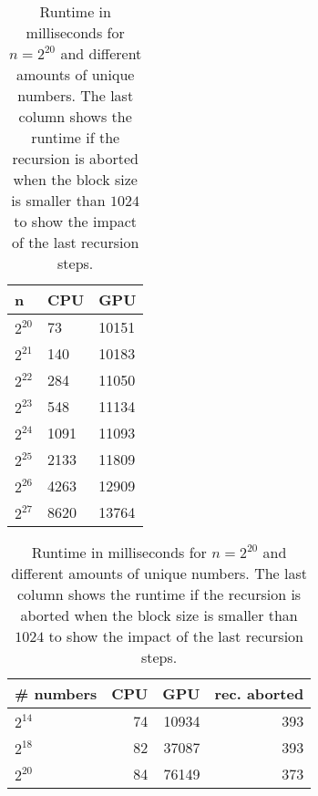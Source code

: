 \documentclass{llncs}
\begin{document}
\begin{table}
\parbox{.45\linewidth}{
\centering

\begin{tabular}{@{}lll@{}}
\toprule
n         & CPU  & GPU   \\ \midrule
$2^{20}$    & 73   & 10151 \\
$2^{21}$    & 140  & 10183 \\
$2^{22}$   & 284  & 11050 \\
$2^{23}$    & 548  & 11134 \\
$2^{24}$  & 1091 & 11093 \\
$2^{25}$   & 2133 & 11809 \\
$2^{26}$   & 4263 & 12909 \\
$2^{27}$ & 8620 & 13764 \\ \bottomrule
\end{tabular}
\caption{Runtime in milliseconds of the QuickSort algorithm with $2^{14}$ different numbers.}
\label{tbl:input_size}
}
\hfill
\parbox{.45\linewidth}{
\centering
\begin{tabular}{@{}lrrr@{}}
\toprule
\# numbers       & CPU & GPU   & rec. aborted    \\ \midrule
$2^{14}$   & 74  & 10934 & 393 \\
$2^{18}$  & 82  & 37087 & 393 \\
$2^{20}$ & 84  & 76149 & 373 \\ \bottomrule
\end{tabular}
\caption{Runtime in milliseconds for $n=2^{20}$ and different amounts of unique numbers. The last column shows the runtime if the recursion is aborted when the block size is smaller than $1024$ to show the impact of the last recursion steps.}
\label{tbl:unique_numbers}
}
\end{table}


%
%
\end{document}
